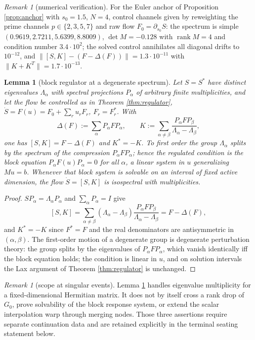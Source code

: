 \documentclass[11pt]{article}
\theoremstyle{plain}
\newtheorem{lemma}[theorem]{Lemma}
\theoremstyle{definition}
\theoremstyle{remark}
\newtheorem{remark}[theorem]{Remark}
\DeclareMathOperator{\rank}{rank}
\begin{document}
\begin{remark}[numerical verification]
For the Euler anchor of Proposition \ref{prop:anchor} with $s_0=1.5$, $N=4$, control
channels given by reweighting the prime channels $p\in\{2,3,5,7\}$ and raw flow
$F_0=\partial_{s_0}S$: the spectrum is simple $(0.9619,2.7211,5.6399,8.8009)$,
$\det M=-0.128$ with $\rank M=4$ and condition number $3.4\cdot10^{2}$; the solved
control annihilates all diagonal drifts to $10^{-12}$, and
$\|[S,K]-(F-\Delta(F))\|=1.3\cdot10^{-11}$ with $\|K+K^{T}\|=1.7\cdot10^{-13}$.
\end{remark}

\begin{lemma}[block regulator at a degenerate spectrum]\label{lem:block}
Let $S=S^{*}$ have distinct eigenvalues $\Lambda_\alpha$ with spectral projections
$P_\alpha$ of arbitrary finite multiplicities, and let the flow be controlled as in
Theorem \ref{thm:regulator}, $\dot S=F(u)=F_0+\sum_ru_rF_r$, $F_r=F_r^{*}$. With
\[
  \Delta(F):=\sum_\alpha P_\alpha FP_\alpha,
  \qquad
  K:=\sum_{\alpha\ne\beta}\frac{P_\alpha FP_\beta}{\Lambda_\alpha-\Lambda_\beta},
\]
one has $[S,K]=F-\Delta(F)$ and $K^{*}=-K$. To first order the group $\Lambda_\alpha$
splits by the spectrum of the compression $P_\alpha FP_\alpha$; hence the regulated
condition is the block equation $P_\alpha F(u)P_\alpha=0$ for all $\alpha$, a linear
system in $u$ generalizing $Mu=b$. Whenever that block system is solvable on an interval
of fixed active dimension, the flow $\dot S=[S,K]$ is isospectral with multiplicities.
\end{lemma}

\begin{proof}
$SP_\alpha=\Lambda_\alpha P_\alpha$ and $\sum_\alpha P_\alpha=I$ give
\[
  [S,K]=\sum_{\alpha\ne\beta}(\Lambda_\alpha-\Lambda_\beta)
  \frac{P_\alpha FP_\beta}{\Lambda_\alpha-\Lambda_\beta}
  =F-\Delta(F),
\]
and $K^{*}=-K$ since $F^{*}=F$ and the real denominators are antisymmetric in
$(\alpha,\beta)$. The first-order motion of a degenerate group is degenerate
perturbation theory: the group splits by the eigenvalues of $P_\alpha FP_\alpha$,
which vanish identically iff the block equation holds; the condition is linear in
$u$, and on solution intervals the Lax argument of Theorem \ref{thm:regulator} is
unchanged.
\end{proof}

\begin{remark}[scope at singular events]
Lemma \ref{lem:block} handles eigenvalue multiplicity for a fixed-dimensional Hermitian
matrix. It does not by itself cross a rank drop of $G_0$, prove solvability of the block
response system, or extend the scalar interpolation warp through merging nodes. Those
three assertions require separate continuation data and are retained explicitly in the
terminal seating statement below.
\end{remark}
\end{document}
